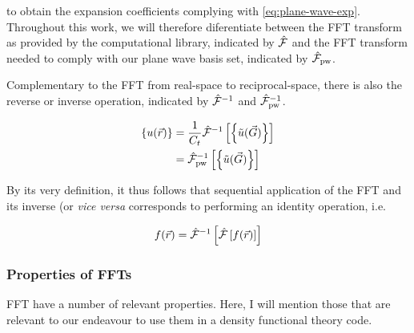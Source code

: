 to obtain the expansion coefficients complying with \cref{eq:plane-wave-exp}. Throughout this work, we will therefore diferentiate between the FFT transform as provided by the computational library, indicated by $\hat{\mathcal{F}}$ and the FFT transform needed to comply with our plane wave basis set, indicated by $\hat{\mathcal{F}}_{\text{pw}}$.

Complementary to the FFT from real-space to reciprocal-space, there is also the reverse or inverse operation, indicated by $\hat{\mathcal{F}}^{-1}$ and $\hat{\mathcal{F}}_{\text{pw}}^{-1}$.

\begin{align}
    \left\{ u(\vec{r}) \right\} &= \frac{1}{C_{t}} \hat{\mathcal{F}}^{-1}\left[\left\{\tilde{u}(\vec{G})\right\}\right] \\
    &= \hat{\mathcal{F}}_{\text{pw}}^{-1}\left[\left\{\tilde{u}(\vec{G})\right\}\right]
    \label{eq:fft_pw_inverse}
\end{align}

By its very definition, it thus follows that sequential application of the FFT and its inverse (or \textit{vice versa} corresponds to performing an identity operation, i.e.

\begin{equation}
    f(\vec{r}) = \hat{\mathcal{F}}^{-1}\left[\hat{\mathcal{F}}\left[f(\vec{r})\right]\right]
\end{equation}

%
%
%
\subsubsection{Properties of FFTs}

FFT have a number of relevant properties. Here, I will mention those that are relevant to our endeavour to use them in a density functional theory code.

